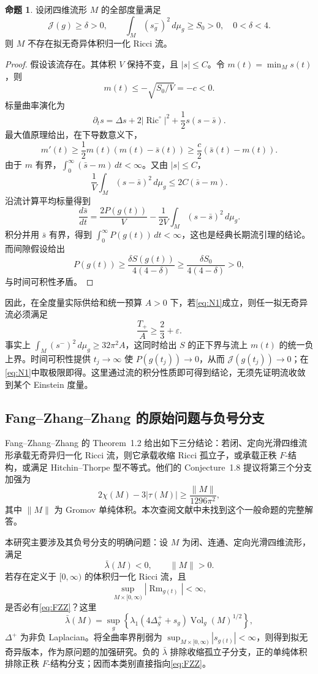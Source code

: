 \documentclass[11pt,a4paper]{article}
\newcommand{\Ric}{\operatorname{Ric}}
\newcommand{\Rm}{\operatorname{Rm}}
\newcommand{\Vol}{\operatorname{Vol}}
\newcommand{\dd}{\,d\mu_g}
\theoremstyle{definition}
\newtheorem{proposition}{命题}[section]
\numberwithin{equation}{section}
\begin{document}
\begin{proposition}\label{prop:flowgap}
设闭四维流形 $M$ 的全部度量满足
\[
\mathcal J(g)\ge\delta>0,\qquad
\int_M(s_g^-)^2\dd\ge S_0>0,
\quad 0<\delta<4.
\]
则 $M$ 不存在拟无奇异体积归一化 Ricci 流。
\end{proposition}
\begin{proof}
假设该流存在。其体积 $V$ 保持不变，且 $|s|\le C$。令 $m(t)=\min_Ms(t)$，则
\[
m(t)\le-\sqrt{S_0/V}=-c<0.
\]
标量曲率演化为
\[
\partial_ts=\Delta s+2|\Ric^\circ|^2+\frac12s(s-\bar s).
\]
最大值原理给出，在下导数意义下，
\[
m'(t)\ge\frac12m(t)(m(t)-\bar s(t))
\ge\frac c2(\bar s(t)-m(t)).
\]
由于 $m$ 有界，$\int_0^\infty(\bar s-m)\,dt<\infty$。又由 $|s|\le C$，
\[
\frac1V\int_M(s-\bar s)^2\dd\le2C(\bar s-m).
\]
沿流计算平均标量得到
\[
\frac{d\bar s}{dt}=\frac{2P(g(t))}{V}
-\frac1{2V}\int_M(s-\bar s)^2\dd.
\]
积分并用 $\bar s$ 有界，得到 $\int_0^\infty P(g(t))\,dt<\infty$，这也是经典长期流引理的结论\cite[Lemma 20]{BaykurIshida}。而间隙假设给出
\[
P(g(t))\ge\frac{\delta S(g(t))}{4(4-\delta)}
\ge\frac{\delta S_0}{4(4-\delta)}>0,
\]
与时间可积性矛盾。
\end{proof}

因此，在全度量实际供给和统一预算 $A>0$ 下，若\eqref{eq:N1}成立，则任一拟无奇异流必须满足
\begin{equation}
\boxed{\frac{T_+}{A}\ge\frac23+\varepsilon.}\label{eq:flowthreshold}
\end{equation}
事实上 $\int_M(s^-)^2\dd\ge32\pi^2A$，这同时给出 $S$ 的正下界与流上 $m(t)$ 的统一负上界。时间可积性提供 $t_j\to\infty$ 使 $P(g(t_j))\to0$，从而 $\mathcal J(g(t_j))\to0$；在\eqref{eq:N1}中取极限即得。这里通过流的积分性质即可得到结论，无须先证明流收敛到某个 Einstein 度量。

\subsection{Fang--Zhang--Zhang 的原始问题与负号分支}
Fang--Zhang--Zhang 的 Theorem~1.2 给出如下三分结论：若闭、定向光滑四维流形承载无奇异归一化 Ricci 流，则它承载收缩 Ricci 孤立子，或承载正秩 $F$-结构，或满足 Hitchin--Thorpe 型不等式。他们的 Conjecture~1.8 提议将第三个分支加强为
\begin{equation}
2\chi(M)-3|\tau(M)|\ge\frac{\|M\|}{1296\pi^2},\label{eq:FZZ}
\end{equation}
其中 $\|M\|$ 为 Gromov 单纯体积\cite[Theorem 1.2 and Conjecture 1.8]{FZZ}。本次查阅文献中未找到这个一般命题的完整解答。

本研究主要涉及其负号分支的明确问题：设 $M$ 为闭、连通、定向光滑四维流形，满足
\[
\bar\lambda(M)<0,\qquad\|M\|>0.
\]
若存在定义于 $[0,\infty)$ 的体积归一化 Ricci 流，且
\[
\sup_{M\times[0,\infty)}|\Rm_{g(t)}|<\infty,
\]
是否必有\eqref{eq:FZZ}？这里
\[
\bar\lambda(M)=\sup_g\left\{\lambda_1(4\Delta_g^++s_g)\Vol_g(M)^{1/2}\right\},
\]
$\Delta^+$ 为非负 Laplacian。将全曲率界削弱为 $\sup_{M\times[0,\infty)}|s_{g(t)}|<\infty$，则得到拟无奇异版本，作为原问题的加强研究\cite{BaykurIshida}。负的 $\bar\lambda$ 排除收缩孤立子分支，正的单纯体积排除正秩 $F$-结构分支；因而本类别直接指向\eqref{eq:FZZ}。
\end{document}
